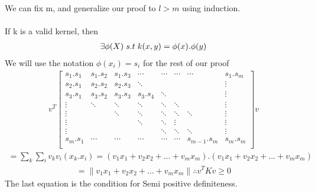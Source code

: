 \documentclass[12pt,onecolumn,a4paper]{article}
\newcommand{\norm}[1]{\left\lVert#1\right\rVert}
\begin{document}
\subsubsection{}
We can fix m, and generalize our proof to $l > m$ using induction.
\\ \\
If k is a valid kernel, then
\begin{align*}
	\exists \phi(X) \hspace*{0.1cm} s.t \hspace{0.1cm} k(x,y) = \phi(x).\phi(y)
\end{align*}
We will use the notation $\phi(x_i) = s_i$ for the rest of our proof
\begin{align*}
	v^T
	\begin{bmatrix}
		s_1.s_1  & s_1.s_2  & s_1.s_3 & \cdots & \cdots & \cdots & \cdots & s_1.s_m \\
		s_2.s_1  & s_2.s_2  & s_2.s_3  & \ddots & && & \vdots \\
		s_3.s_1 & s_3.s_2  & s_3.s_3 & s_3.s_4  & \ddots & &  & \vdots \\
		\vdots & \ddots & \ddots & \ddots & \ddots & \ddots &  & \vdots \\
		\vdots & & \ddots & \ddots & \ddots & \ddots & \ddots& \vdots\\
		\vdots  & & & \ddots & \ddots  & \vdots  &   & \vdots\\
		\vdots  & && & \ddots & \ddots  & \ddots  &  \vdots \\
		s_m.s_1 & \cdots &  \cdots & \cdots & \cdots & \cdots & s_{m - 1}.s_m  & s_m.s_m  \\
	\end{bmatrix}
	v
\end{align*}
\begin{align*}
	= \sum_{k}\sum_{i} v_k v_i (x_k.x_i) = (v_1x_1 + v_2 x_2 + \dots + v_m x_m).(v_1x_1 + v_2 x_2 + \dots + v_m x_m) 
\end{align*}
\begin{align*}
	= \norm{v_1x_1 + v_2 x_2 + \dots + v_m x_m} \therefore v^T K v \geq 0
\end{align*}
The last equation is the condition for Semi positive definiteness.
\end{document}
